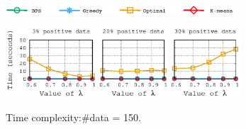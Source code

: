 \begin{figure}[H]
\begin{centering}
\includegraphics[width=8.5cm]{imgs/legend2}
\par\end{centering}
\begin{centering}
{\includegraphics[width=8.75cm]{imgs/Twitter_results/time_posrate_Data_150}}
\par\end{centering}
\caption{Time complexity:\#data = 150.}
\label{fig:Time_vs_Lambda}
\end{figure}











